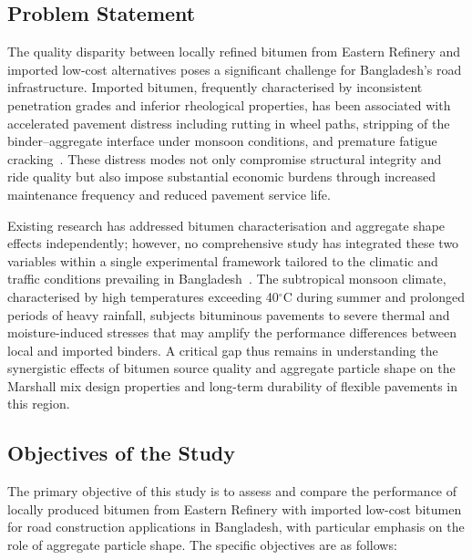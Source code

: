 \documentclass[12pt,a4paper]{article}
\begin{document}
\subsection{Problem Statement}

The quality disparity between locally refined bitumen from Eastern Refinery and imported low-cost alternatives poses a significant challenge for Bangladesh's road infrastructure. Imported bitumen, frequently characterised by inconsistent penetration grades and inferior rheological properties, has been associated with accelerated pavement distress including rutting in wheel paths, stripping of the binder--aggregate interface under monsoon conditions, and premature fatigue cracking~\cite{khairandish2020influence}. These distress modes not only compromise structural integrity and ride quality but also impose substantial economic burdens through increased maintenance frequency and reduced pavement service life.

Existing research has addressed bitumen characterisation and aggregate shape effects independently; however, no comprehensive study has integrated these two variables within a single experimental framework tailored to the climatic and traffic conditions prevailing in Bangladesh~\cite{sood2015evaluation}. The subtropical monsoon climate, characterised by high temperatures exceeding 40$^{\circ}$C during summer and prolonged periods of heavy rainfall, subjects bituminous pavements to severe thermal and moisture-induced stresses that may amplify the performance differences between local and imported binders. A critical gap thus remains in understanding the synergistic effects of bitumen source quality and aggregate particle shape on the Marshall mix design properties and long-term durability of flexible pavements in this region.

\subsection{Objectives of the Study}

The primary objective of this study is to assess and compare the performance of locally produced bitumen from Eastern Refinery with imported low-cost bitumen for road construction applications in Bangladesh, with particular emphasis on the role of aggregate particle shape. The specific objectives are as follows:
\end{document}
